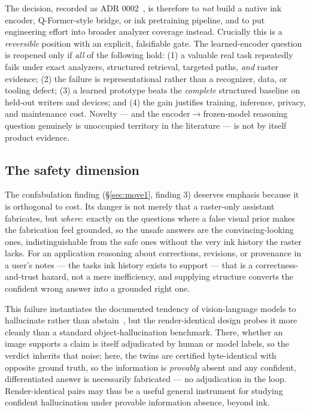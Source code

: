 \documentclass[11pt]{article}
\begin{document}
The decision, recorded as ADR 0002~\cite{adr2}, is therefore to \emph{not} build
a native ink encoder, Q-Former-style bridge, or ink pretraining pipeline, and to
put engineering effort into broader analyzer coverage instead. Crucially this is
a \emph{reversible} position with an explicit, falsifiable gate. The
learned-encoder question is reopened only if \emph{all} of the following hold:
(1) a valuable real task repeatedly fails under exact analyzers, structured
retrieval, targeted paths, \emph{and} raster evidence; (2) the failure is
representational rather than a recognizer, data, or tooling defect; (3) a learned
prototype beats the \emph{complete} structured baseline on held-out writers and
devices; and (4) the gain justifies training, inference, privacy, and
maintenance cost. Novelty --- and the encoder$\rightarrow$frozen-model reasoning
question genuinely is unoccupied territory in the literature --- is not by itself
product evidence.

\subsection{The safety dimension}
The confabulation finding (\S\ref{sec:move1}, finding 3) deserves emphasis
because it is orthogonal to cost. Its danger is not merely that a raster-only
assistant fabricates, but \emph{where}: exactly on the questions where a
false visual prior makes the fabrication feel grounded, so the unsafe answers are
the convincing-looking ones, indistinguishable from the safe ones without the very
ink history the raster lacks. For an application reasoning about corrections,
revisions, or provenance in a user's notes --- the tasks ink history exists to
support --- that is a correctness-and-trust hazard, not a mere inefficiency, and
supplying structure converts the confident wrong answer into a grounded right
one.

This failure instantiates the documented tendency of vision-language models to
hallucinate rather than abstain~\cite{pope}, but the render-identical design
probes it more cleanly than a standard object-hallucination benchmark. There,
whether an image supports a claim is itself adjudicated by human or model labels,
so the verdict inherits that noise; here, the twins are certified byte-identical
with opposite ground truth, so the information is \emph{provably} absent and any
confident, differentiated answer is necessarily fabricated --- no adjudication in
the loop. Render-identical pairs may thus be a useful general instrument for
studying confident hallucination under provable information absence, beyond ink.
\end{document}
